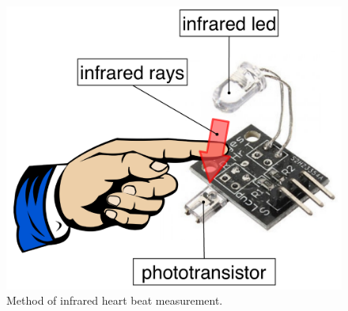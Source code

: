 \documentclass[11pt,a4paper]{article}
\begin{document}
\begin{figure}[H]
    \centering
    \includegraphics[scale=0.4]{img/infrared_method.pdf}
    \caption{Method of infrared heart beat measurement.}
    \label{fig:method}
\end{figure}

\newpage
\end{document}
